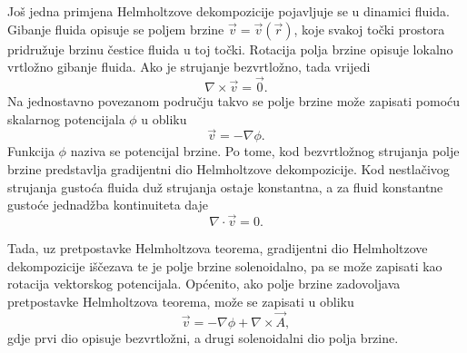 \documentclass[12pt,a4paper]{article}
\begin{document}
Još jedna primjena Helmholtzove dekompozicije pojavljuje se u dinamici
fluida. Gibanje fluida opisuje se poljem brzine $\overrightarrow{v}=\overrightarrow{v}(\overrightarrow{r})$, koje svakoj
točki prostora pridružuje brzinu čestice fluida u toj točki. Rotacija polja brzine opisuje lokalno vrtložno gibanje fluida.
Ako je strujanje bezvrtložno, tada vrijedi
$$
\nabla\times\overrightarrow{v}=\overrightarrow{0}.
$$
Na jednostavno povezanom području takvo se polje brzine može zapisati pomoću skalarnog potencijala
$\phi$ u obliku
$$
\overrightarrow{v}=-\nabla\phi.
$$
Funkcija $\phi$ naziva se potencijal brzine. Po tome, kod bezvrtložnog strujanja polje brzine predstavlja
gradijentni dio Helmholtzove dekompozicije. Kod nestlačivog strujanja gustoća fluida duž strujanja ostaje konstantna, a za fluid konstantne gustoće jednadžba kontinuiteta daje
\[
\nabla \cdot \overrightarrow{v} = 0.
\]

Tada, uz pretpostavke Helmholtzova teorema, gradijentni dio Helmholtzove dekompozicije iščezava te je polje brzine solenoidalno, pa se može zapisati kao rotacija vektorskog potencijala. Općenito, ako polje brzine zadovoljava pretpostavke Helmholtzova teorema,
može se zapisati u obliku
\[
\overrightarrow{v}
=
-\nabla \phi
+
\nabla\times\overrightarrow{A},
\]
gdje prvi dio opisuje bezvrtložni, a drugi solenoidalni dio polja brzine.
\end{document}
